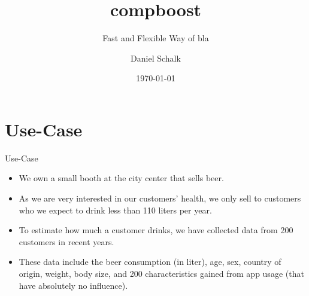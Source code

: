 \documentclass[10pt]{beamer}\usepackage[]{graphicx}\usepackage[]{color}
\title{compboost}
\subtitle{Fast and Flexible Way of bla}
\date{\today}
\author{Daniel Schalk}
\institute{LMU Munich\\Working Group Computational Statistics}
\begin{document}



\maketitle



\section{Use-Case}

\begin{frame}{Use-Case}

\begin{itemize}
  \item
    We own a small booth at the city center that sells beer.

  \item
    As we are very interested in our customers' health, we only sell to customers who we expect to drink less than 110 liters per year.

  \item
    To estimate how much a customer drinks, we have collected data from 200 customers in recent years.

  \item
    These data include the beer consumption (in liter), age, sex, country of origin, weight, body size, and 200 characteristics gained from app usage (that have absolutely no influence).
\end{itemize}

\end{frame}
\end{document}
